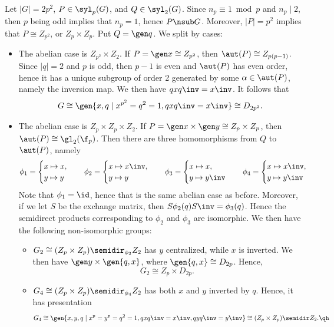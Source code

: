 \begin{sol}
    Let $|G| = 2p^2$, $P \in \syl_p(G)$, and $Q \in \syl_2(G)$. Since $n_p \equiv 1 \bmod p$ and $n_p \mid 2$, then $p$ being odd implies that $n_p = 1$, hence $P \nsub G$. Moreover, $|P| = p^2$ implies that $P \cong Z_{p^2}$, or $Z_p \times Z_p$. Put $Q = \gen q$. We split by cases:
    \begin{itemize}
        \item The abelian case is $Z_{p^2} \times Z_2$. If $P = \gen x \cong Z_{p^2}$, then $\aut(P) \cong Z_{p(p - 1)}$. Since $|q| = 2$ and $p$ is odd, then $p - 1$ is even and $\aut(P)$ has even order, hence it has a unique subgroup of order 2 generated by some $\alpha \in \aut(P)$, namely the inversion map. We then have $qxq\inv = x\inv$. It follows that
        \[G \cong \gen{x, q \mid x^{p^2} = q^2 = 1, qxq\inv = x\inv} \cong D_{2p^2}.\]
        \item The abelian case is $Z_p \times Z_p \times Z_2$. If $P = \gen x \times \gen y \cong Z_p \times Z_p$, then $\aut(P) \cong \gl_2(\f_p)$. Then there are three homomorphisms from $Q$ to $\aut(P)$, namely
        \[\phi_1 = 
        \begin{cases}
            x \mapsto x, \\
            y \mapsto y
        \end{cases} \quad
        \phi_2 = 
        \begin{cases}
            x \mapsto x\inv, \\
            y \mapsto y
        \end{cases} \quad
        \phi_3 = 
        \begin{cases}
            x \mapsto x, \\
            y \mapsto y\inv
        \end{cases} \quad
        \phi_4 = 
        \begin{cases}
            x \mapsto x\inv, \\
            y \mapsto y\inv
        \end{cases} \]
        Note that $\phi_1 = \id$, hence that is the same abelian case as before. Moreover, if we let $S$ be the exchange matrix, then $S\phi_2(q)S\inv = \phi_3(q)$. Hence the semidirect products corresponding to $\phi_2$ and $\phi_3$ are isomorphic. We then have the following non-isomorphic groups:
        \begin{itemize}
            \item $G_2 \cong (Z_p \times Z_p) \semidir_{\phi_2} Z_2$ has $y$ centralized, while $x$ is inverted. We then have $\gen y \times \gen{q, x}$, where $\gen{q, x} \cong D_{2p}$. Hence,
            \[G_2 \cong Z_p \times D_{2p}.\]
            \item $G_4 \cong (Z_p \times Z_p) \semidir_{\phi_4} Z_2$ has both $x$ and $y$ inverted by $q$. Hence, it has presentation
            \[G_4 \cong \gen{x, y, q \mid x^p = y^p = q^2 = 1, qxq\inv = x\inv, qyq\inv = y\inv} \cong (Z_p \times Z_p) \semidir Z_2. \qh\]
        \end{itemize}
    \end{itemize}
\end{sol}

